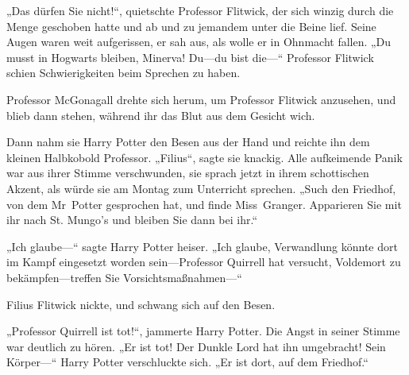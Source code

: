 „Das dürfen Sie nicht!“, quietschte Professor Flitwick, der sich winzig durch die Menge geschoben hatte und ab und zu jemandem unter die Beine lief. Seine Augen waren weit aufgerissen, er sah aus, als wolle er in Ohnmacht fallen.
„Du musst in Hogwarts bleiben, Minerva! Du—du bist die—“
Professor Flitwick schien Schwierigkeiten beim Sprechen zu haben.

Professor McGonagall drehte sich herum, um Professor Flitwick anzusehen, und blieb dann stehen, während ihr das Blut aus dem Gesicht wich.

Dann nahm sie Harry Potter den Besen aus der Hand und reichte ihn dem kleinen Halbkobold Professor.
„Filius“, sagte sie knackig.
Alle aufkeimende Panik war aus ihrer Stimme verschwunden, sie sprach jetzt in ihrem schottischen Akzent, als würde sie am Montag zum Unterricht sprechen.
„Such den Friedhof, von dem Mr~Potter gesprochen hat, und finde Miss~Granger. Apparieren Sie mit ihr nach St. Mungo’s und bleiben Sie dann bei ihr.“

„Ich glaube—“ sagte Harry Potter heiser. „Ich glaube, Verwandlung könnte dort im Kampf eingesetzt worden sein—Professor Quirrell hat versucht, Voldemort zu bekämpfen—treffen Sie Vorsichtsmaßnahmen—“

Filius Flitwick nickte, und schwang sich auf den Besen.

„Professor Quirrell ist tot!“, jammerte Harry Potter. Die Angst in seiner Stimme war deutlich zu hören.
„Er ist tot! Der Dunkle Lord hat ihn umgebracht! Sein Körper—“ Harry Potter verschluckte sich. „Er ist dort, auf dem Friedhof.“

